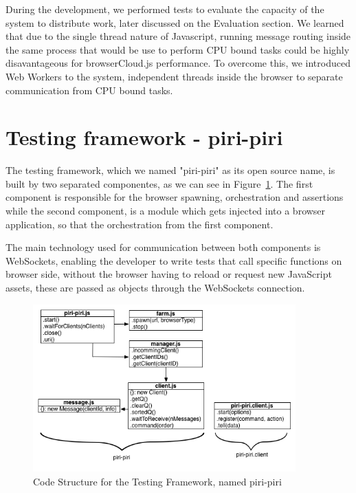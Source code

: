 During the development, we performed tests to evaluate the capacity of the system to distribute work, later discussed on the Evaluation section. We learned that due to the single thread nature of Javascript, running message routing inside the same process that would be use to perform CPU bound tasks could be highly disavantageous for browserCloud.js performance. To overcome this, we introduced Web Workers to the system, independent threads inside the browser to separate communication from CPU bound tasks.

\section{Testing framework - piri-piri}

The testing framework, which we named "piri-piri" as its open source name, is built by two separated componentes, as we can see in Figure~\ref{fig:d-p-p}. The first component is responsible for the browser spawning, orchestration and assertions while the second component, is a module which gets injected into a browser application, so that the orchestration from the first component.

The main technology used for communication between both components is WebSockets, enabling the developer to write tests that call specific functions on browser side, without the browser having to reload or request new JavaScript assets, these are passed as objects through the WebSockets connection.

\begin{figure}[h!]
  \centering
  \includegraphics[width=0.9\textwidth]{figs/diagram-piri-piri}
  \caption{Code Structure for the Testing Framework, named piri-piri}
  \label{fig:d-p-p}
\end{figure}

